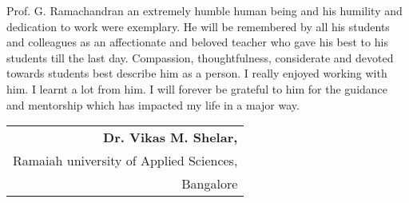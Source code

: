 Prof. G. Ramachandran an extremely humble human being and his humility and dedication to work were exemplary. He will be remembered by all his students and colleagues as an affectionate and beloved teacher who gave his best to his students till the last day. Compassion, thoughtfulness, considerate and devoted towards students best describe him as a person. I really enjoyed working with him. I learnt a lot from him. I will forever be grateful to him for the guidance and mentorship which has impacted my life in a major way.

\begin{flushright}
\begin{tabular}{r@{}}
\textbf{Dr. Vikas M. Shelar,}\\
Ramaiah university of Applied Sciences,\\
Bangalore
\end{tabular}
\end{flushright}

